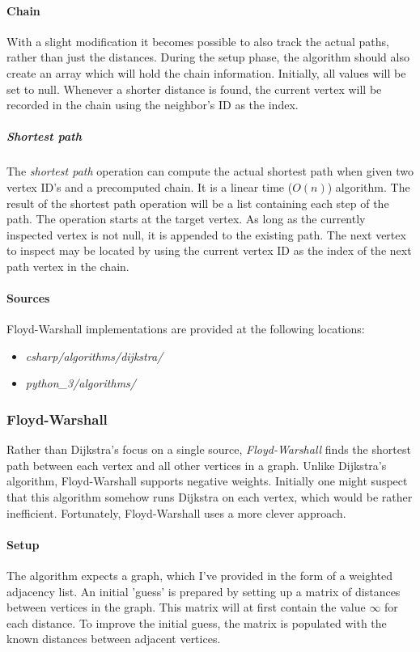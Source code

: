 \documentclass{article}
\begin{document}
\paragraph{Chain}
With a slight modification it becomes possible to also track the actual paths, rather than just the distances.
During the setup phase, the algorithm should also create an array which will hold the chain information.
Initially, all values will be set to null. Whenever a shorter distance is found, the current vertex will be
recorded in the chain using the neighbor's ID as the index.

\subparagraph{Shortest path}
The {\em shortest path} operation can compute the actual shortest path when given two vertex ID's and a precomputed
chain. It is a linear time (\(O(n)\)) algorithm. The result of the shortest path operation will be a list containing
each step of the path. The operation starts at the target vertex. As long as the currently inspected vertex is not
null, it is appended to the existing path. The next vertex to inspect may be located by using the current vertex ID
as the index of the next path vertex in the chain.

\begin{samepage}
  \paragraph{Sources}
  Floyd-Warshall implementations are provided at the following locations:
  \begin{itemize}
  \item{{\em csharp/algorithms/dijkstra/}}
  \item{{\em python\_3/algorithms/}}
  \end{itemize}
\end{samepage}


\subsubsection{Floyd-Warshall}
Rather than Dijkstra's focus on a single source, {\em Floyd-Warshall} finds the shortest path between each vertex
and all other vertices in a graph. Unlike Dijkstra's algorithm, Floyd-Warshall supports negative weights.
Initially one might suspect that this algorithm somehow runs Dijkstra on each vertex, which would be rather
inefficient. Fortunately, Floyd-Warshall uses a more clever approach.

\paragraph{Setup}
The algorithm expects a graph, which I've provided in the form of a weighted adjacency list. An initial 'guess' is
prepared by setting up a matrix of distances between vertices in the graph. This matrix will at first contain the
value \(\infty\) for each distance. To improve the initial guess, the matrix is populated with the known distances
between adjacent vertices.
\end{document}
